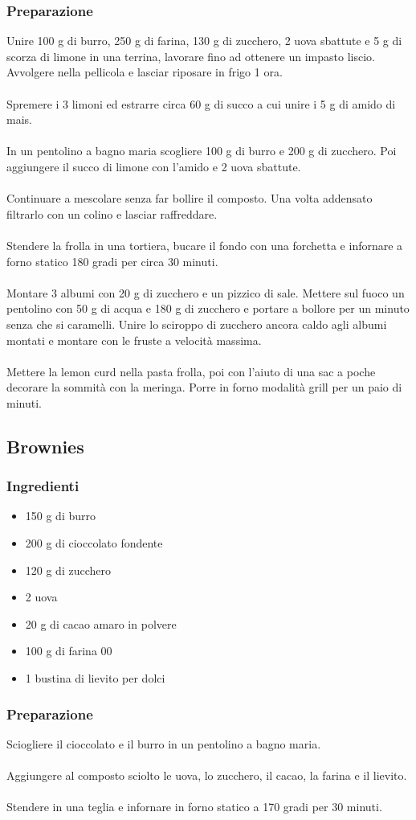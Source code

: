 \documentclass[12pt, a4paper]{article}
\begin{document}
\subsubsection{Preparazione}
Unire 100 g di burro, 250 g di farina, 130 g di zucchero, 2 uova sbattute e 5 g di scorza di limone in
una terrina, lavorare fino ad ottenere un impasto liscio. Avvolgere nella pellicola e lasciar riposare in frigo
1 ora.\\\\
Spremere i 3 limoni ed estrarre circa 60 g di succo a cui unire i 5 g di amido di mais.\\\\
In un pentolino a bagno maria scogliere 100 g di burro e 200 g di zucchero. Poi aggiungere il succo di limone con
l'amido e 2 uova sbattute.\\\\
Continuare a mescolare senza far bollire il composto. Una volta addensato filtrarlo con un colino e 
lasciar raffreddare.\\\\
Stendere la frolla in una tortiera, bucare il fondo con una forchetta e infornare a forno statico 180 gradi per circa 30 minuti.\\\\
Montare 3 albumi con 20 g di zucchero e un pizzico di sale. Mettere sul fuoco un pentolino con 50 g di acqua e 180 g di zucchero e
portare a bollore per un minuto senza che si caramelli. Unire lo sciroppo di zucchero ancora caldo agli albumi montati e montare con le
fruste a velocità massima.\\\\
Mettere la lemon curd nella pasta frolla, poi con l'aiuto di una sac a poche decorare la sommità con la meringa. Porre in forno modalità
grill per un paio di minuti.
\clearpage

\subsection{Brownies}

\subsubsection{Ingredienti}
\begin{itemize}
\item   150 g di burro
\item	200 g di cioccolato fondente
\item	120 g di zucchero
\item	2 uova
\item	20 g di cacao amaro in polvere
\item	100 g di farina 00
\item	1 bustina di lievito per dolci
\end{itemize}

\subsubsection{Preparazione}
	Sciogliere il cioccolato e il burro in un pentolino a bagno maria.\\\\
	Aggiungere al composto sciolto le uova, lo zucchero, il cacao, la farina e il lievito.\\\\
	Stendere in una teglia e infornare in forno statico a 170 gradi per 30 minuti.
\clearpage
\end{document}
